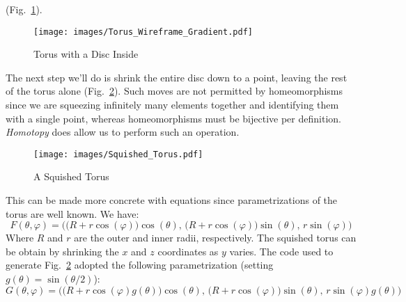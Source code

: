 \documentclass[oneside]{book}                                                  %
\begin{document}
                (Fig.~\ref{fig:Torus_with_Disc_Inside}).
                \begin{figure}[H]
                    \centering
                    \captionsetup{type=figure}
                    \texttt{[image: images/Torus\_Wireframe\_Gradient.pdf]}
                    \caption{Torus with a Disc Inside}
                    \label{fig:Torus_with_Disc_Inside}
                \end{figure}
                The next step we'll do is shrink the entire disc down to a
                point, leaving the rest of the torus alone
                (Fig.~\ref{fig:Squished_Torus}). Such moves are not permitted by
                homeomorphisms since we are squeezing infinitely many elements
                together and identifying them with a single point, whereas
                homeomorphisms must be bijective per definition.
                \textit{Homotopy} does allow us to perform such an operation.
                \begin{figure}[H]
                    \centering
                    \captionsetup{type=figure}
                    \texttt{[image: images/Squished\_Torus.pdf]}
                    \caption{A Squished Torus}
                    \label{fig:Squished_Torus}
                \end{figure}
                This can be made more concrete with equations since
                parametrizations of the torus are well known. We have:
                \begin{equation}
                    F(\theta,\varphi)=\Big(
                        \big(R+r\cos(\varphi)\big)\cos(\theta),\,
                        \big(R+r\cos(\varphi)\big)\sin(\theta),\,
                        r\sin(\varphi)\Big)
                \end{equation}
                Where $R$ and $r$ are the outer and inner radii, respectively.
                The squished torus can be obtain by shrinking the $x$ and $z$
                coordinates as $y$ varies. The code used to generate
                Fig.~\ref{fig:Squished_Torus} adopted the following
                parametrization (setting $g(\theta)=\sin(\theta/2)$):
                \begin{equation}
                        G(\theta,\varphi)=\Big(
                            \big(R+r\cos(\varphi)g(\theta)\big)\cos(\theta),\,
                            \big(R+r\cos(\varphi)\big)\sin(\theta),\,
                            r\sin(\varphi)g(\theta)\Big)
                \end{equation}
\end{document}
